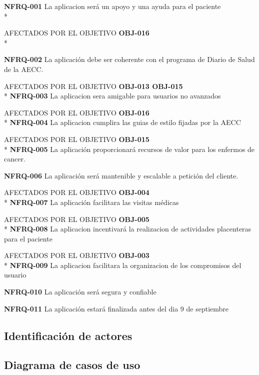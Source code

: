 \documentclass[../pfc.tex]{subfiles}
\begin{document}
	\textbf{NFRQ-001}		La aplicacion será un apoyo y una ayuda para el paciente\\*
	
	
	AFECTADOS POR EL OBJETIVO 	\textbf{OBJ-016}\\*
		
	\textbf{NFRQ-002}		La aplicación debe ser coherente con el programa de Diario de Salud de la AECC.
	
	
	AFECTADOS POR EL OBJETIVO 	\textbf{OBJ-013 OBJ-015}\\*		
	\textbf{NFRQ-003}		La aplicacion sera amigable para usuarios no avanzados
	
	
	AFECTADOS POR EL OBJETIVO 	\textbf{OBJ-016}\\*	
	\textbf{NFRQ-004}		La aplicacion cumplira las guias de estilo fijadas por la AECC
	
	
	AFECTADOS POR EL OBJETIVO 	\textbf{OBJ-015}\\*		
	\textbf{NFRQ-005}		La aplicación proporcionará recursos de valor para los enfermos de cancer.
	
	
		
	\textbf{NFRQ-006}		La aplicación será mantenible y escalable a petición del cliente.


	AFECTADOS POR EL OBJETIVO 	\textbf{OBJ-004}\\*	
	\textbf{NFRQ-007}		La aplicación facilitara las visitas médicas


	AFECTADOS POR EL OBJETIVO 	\textbf{OBJ-005}\\*			
	\textbf{NFRQ-008}		La aplicacion incentivará la realizacion de actividades placenteras para el paciente


	AFECTADOS POR EL OBJETIVO 	\textbf{OBJ-003}\\*		
	\textbf{NFRQ-009}		La aplicacion facilitara la organizacion de los compromisos del usuario


		
	\textbf{NFRQ-010}		La aplicación será segura y confiable
	
	
	\textbf{NFRQ-011}		La aplicación estará finalizada antes del dia 9 de septiembre



	

	\subsection{Identificación de actores}
		
	\subsection{Diagrama de casos de uso }
		
\end{document}
